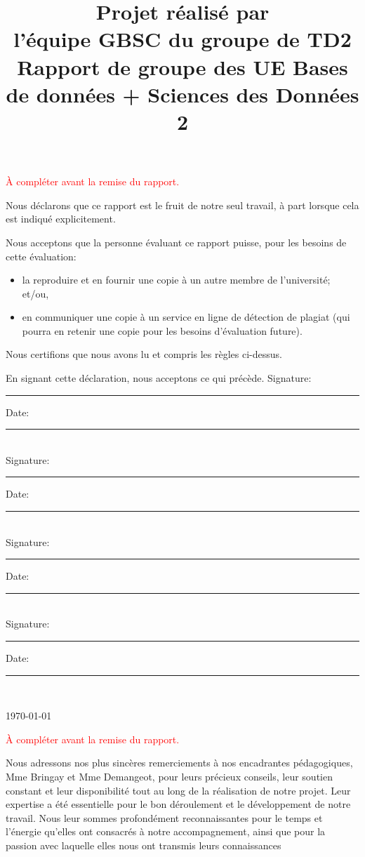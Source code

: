\documentclass[mstat,12pt]{unswthesis}
\title{Projet réalisé par\\[0.5cm] l'équipe GBSC du groupe de TD2 \\[3cm]Rapport
de groupe des UE \newline  Bases de données + Sciences des Données 2}
\author{\Authornameonly}
\begin{document}
\beforepreface




\textcolor{red}{À compléter avant la remise du rapport.}

\vskip 2pc \noindent Nous déclarons que ce rapport est le fruit de notre seul travail, à part lorsque cela est indiqué  explicitement. 

\vskip 2pc  \noindent Nous acceptons que la personne évaluant ce rapport puisse, pour les besoins de cette évaluation:
\begin{itemize}
\item la reproduire et en fournir une copie à un autre membre de l'université; et/ou,
\item en communiquer une copie à un service en ligne de détection de plagiat (qui pourra en retenir une copie pour les besoins d'évaluation future).
\end{itemize}

\vskip 2pc \noindent Nous certifions que nous avons lu et compris les règles ci-dessus.\vspace{24pt}

\vskip 2pc \noindent En signant cette déclaration, nous acceptons ce qui précède.
\vskip 2pc \noindent
Signature: \rule{7cm}{0.25pt} \hfill Date: \rule{4cm}{0.25pt} \\[1cm]
Signature: \rule{7cm}{0.25pt} \hfill Date: \rule{4cm}{0.25pt} \\[1cm]
Signature: \rule{7cm}{0.25pt} \hfill Date: \rule{4cm}{0.25pt} \\[1cm]
Signature: \rule{7cm}{0.25pt} \hfill Date: \rule{4cm}{0.25pt} \\[1cm]
\vskip 1pc


{\bigskip\bigskip\bigskip\noindent} \today




\textcolor{red}{À compléter avant la remise du rapport.}

{\bigskip}Nous adressons nos plus sincères remerciements à nos
encadrantes pédagogiques, Mme Bringay et Mme Demangeot, pour leurs
précieux conseils, leur soutien constant et leur disponibilité tout au
long de la réalisation de notre projet. Leur expertise a été essentielle
pour le bon déroulement et le développement de notre travail.
\newline Nous leur sommes profondément reconnaissantes pour le temps et
l'énergie qu'elles ont consacrés à notre accompagnement, ainsi que pour
la passion avec laquelle elles nous ont transmis leurs
connaissances\\[1cm] 
\end{document}
